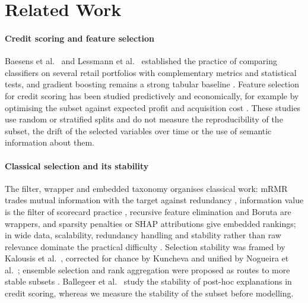 \documentclass[final,5p,twocolumn]{elsarticle}
\begin{document}

\section{Related Work}
\label{sec:related_work}

\paragraph{Credit scoring and feature selection}
Baesens et al.\ \cite{baesens2003} and Lessmann et al.\ \cite{lessmann2015} established the practice of comparing classifiers on several retail portfolios with complementary metrics and statistical tests, and gradient boosting remains a strong tabular baseline \cite{gunnarsson2021}. Feature selection for credit scoring has been studied predictively and economically, for example by optimising the subset against expected profit and acquisition cost \cite{maldonado2017}. These studies use random or stratified splits and do not measure the reproducibility of the subset, the drift of the selected variables over time or the use of semantic information about them.

\paragraph{Classical selection and its stability}
The filter, wrapper and embedded taxonomy \cite{kohavi1997,guyon2003} organises classical work: mRMR trades mutual information with the target against redundancy \cite{peng2005}, information value is the filter of scorecard practice \cite{siddiqi2006}, recursive feature elimination \cite{guyon2002} and Boruta \cite{kursa2010,breiman2001} are wrappers, and sparsity penalties \cite{tibshirani1996} or SHAP attributions \cite{lundberg2017} give embedded rankings; in wide data, scalability, redundancy handling and stability rather than raw relevance dominate the practical difficulty \cite{boloncanedo2015}. Selection stability was framed by Kalousis et al.\ \cite{kalousis2007}, corrected for chance by Kuncheva \cite{kuncheva2007} and unified by Nogueira et al.\ \cite{nogueira2018}; ensemble selection and rank aggregation were proposed as routes to more stable subsets \cite{saeys2008,dwork2001}. Ballegeer et al.\ \cite{ballegeer2025} study the stability of post-hoc explanations in credit scoring, whereas we measure the stability of the subset before modelling.
\end{document}
